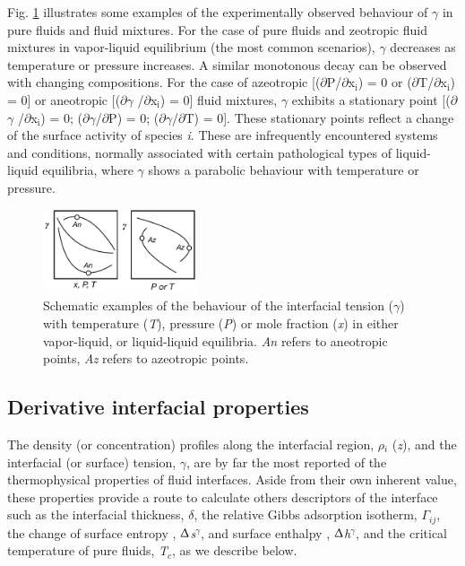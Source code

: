 \documentclass[9pt,bestpractices]{livecoms}
\begin{document}
Fig. \ref{fig:3} illustrates some examples of the experimentally observed behaviour of
$\gamma$ in pure fluids and fluid mixtures. For the case of pure fluids and
zeotropic fluid mixtures in vapor-liquid equilibrium (the most common
scenarios), {${\gamma}$} decreases as temperature or pressure increases.
A similar monotonous decay can be observed with changing compositions. For the
case of azeotropic [(${\partial}$P/${\partial}$x$_{\mathrm{i}}$) = 0 or
(${\partial}$T/${\partial}$x$_{\mathrm{i}}$) = 0] or aneotropic
[(${\partial}${${\gamma}$} /${\partial}$x$_{\mathrm{i}}$) = 0] fluid mixtures,
{${\gamma}$} exhibits a stationary point [(${\partial}${${\gamma}$}
/${\partial}$x$_{\mathrm{i}}$) = 0; (${\partial}${${\gamma}$}/${\partial}$P)
= 0; (${\partial}${${\gamma}$}/${\partial}$T) = 0]. These stationary points
reflect a change of the surface activity of species \textit{i}. These are
infrequently encountered systems and conditions, normally associated with
certain pathological types of liquid-liquid equilibria, where {${\gamma}$} shows a parabolic
behaviour with temperature or pressure.
\begin{figure}
  \centering
  \includegraphics[width=0.4\textwidth]{gfx/image7.png}
  \caption{Schematic examples of the behaviour of the interfacial tension ({${\gamma}$}) with temperature (\textit{T}), pressure (\textit{P}) or mole fraction (\textit{x}) in either vapor-liquid, or liquid-liquid equilibria. \textit{An} refers to aneotropic points, \textit{Az} refers to azeotropic points.}
  \label{fig:3}
\end{figure}

\subsection{Derivative interfacial properties}

The density (or concentration) profiles along the interfacial region,
${\rho}$$_{i}$ (\textit{z}), and the interfacial (or surface) tension,
{${\gamma}$}, are by far the most reported of the thermophysical properties of
fluid interfaces. Aside from their own inherent value, these properties provide
a route to calculate others descriptors of the interface such as the
interfacial thickness, {${\delta}$}, the relative Gibbs adsorption isotherm,
${\Gamma}$$_{ij}$, the change of surface entropy
, ${\Updelta}$\textit{s}$^{{\gamma}}$, and surface enthalpy
, ${\Updelta}$\textit{h}$^{{\gamma}}$, and the critical temperature of pure
fluids, \textit{T}$_{c}$, as we describe below. 
\end{document}
